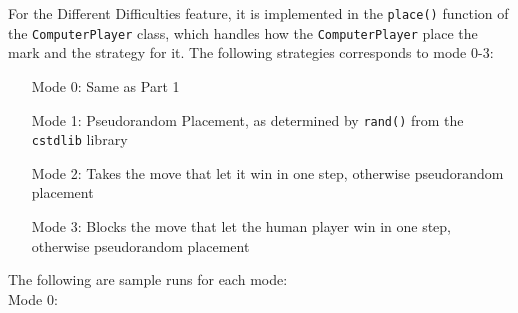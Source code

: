 \documentclass{article}
\begin{document}
For the Different Difficulties feature, it is implemented in the \texttt{place()} function of the \texttt{ComputerPlayer} class, which handles how the \texttt{ComputerPlayer} place the mark and the strategy for it. The following strategies corresponds to mode 0-3:
\begin{itemize}
\item[ Mode 0: ]{Same as Part 1}
\item[ Mode 1: ]{Pseudorandom Placement, as determined by \texttt{rand()} from the \texttt{cstdlib} library}
\item[ Mode 2: ]{Takes the move that let it win in one step, otherwise pseudorandom placement}
\item[ Mode 3: ]{Blocks the move that let the human player win in one step, otherwise pseudorandom placement}
\end{itemize}
The following are sample runs for each mode:\\
Mode 0:\\
\end{document}
